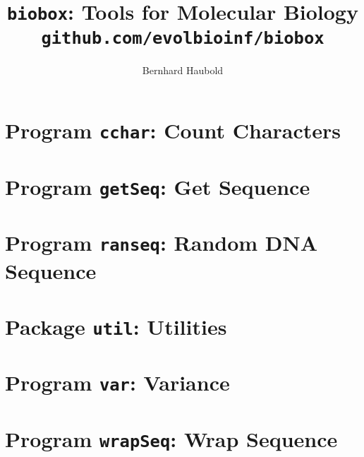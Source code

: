 \documentclass[a4paper]{report}
\begin{document}
\pagestyle{noweb}

\title{\texttt{biobox}: Tools for Molecular Biology\\
\small\texttt{github.com/evolbioinf/biobox}}
\author{Bernhard Haubold}
\maketitle
\tableofcontents

\chapter{Program \texttt{cchar}: Count Characters}\label{ch:cch}

\chapter{Program \texttt{getSeq}: Get Sequence}\label{ch:get}

\chapter{Program \texttt{ranseq}: Random DNA Sequence}\label{ch:ran}

\chapter{Package \texttt{util}: Utilities}\label{ch:uti}

\chapter{Program \texttt{var}: Variance}\label{ch:var}

\chapter{Program \texttt{wrapSeq}: Wrap Sequence}\label{ch:wra}



\end{document}

